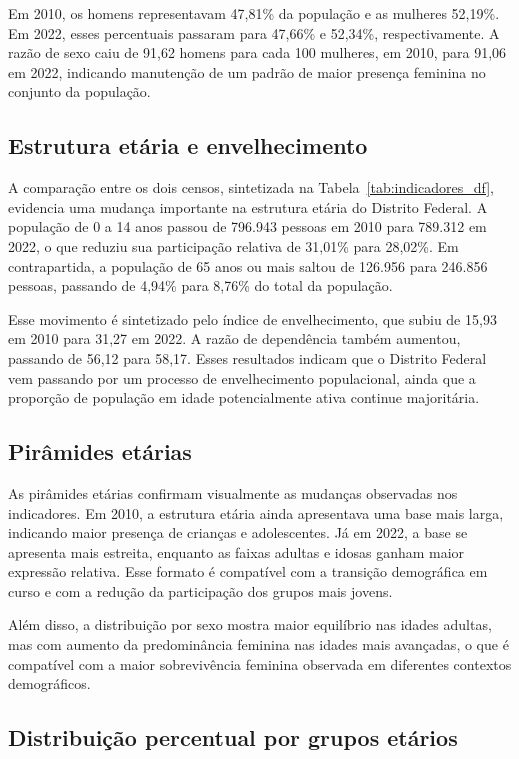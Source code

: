 \documentclass[a4paper,12pt]{article}
\begin{document}
Em 2010, os homens representavam 47,81\% da população e as mulheres 52,19\%.
Em 2022, esses percentuais passaram para 47,66\% e 52,34\%, respectivamente.
A razão de sexo caiu de 91,62 homens para cada 100 mulheres, em 2010, para
91,06 em 2022, indicando manutenção de um padrão de maior presença feminina no
conjunto da população.

\subsection{Estrutura etária e envelhecimento}

A comparação entre os dois censos, sintetizada na Tabela~\ref{tab:indicadores_df},
evidencia uma mudança importante na estrutura etária do Distrito Federal. A
população de 0 a 14 anos passou de 796.943 pessoas em 2010 para 789.312 em
2022, o que reduziu sua participação relativa de 31,01\% para 28,02\%. Em
contrapartida, a população de 65 anos ou mais saltou de 126.956 para 246.856
pessoas, passando de 4,94\% para 8,76\% do total da população.

Esse movimento é sintetizado pelo índice de envelhecimento, que subiu de 15,93
em 2010 para 31,27 em 2022. A razão de dependência também aumentou, passando de
56,12 para 58,17. Esses resultados indicam que o Distrito Federal vem passando
por um processo de envelhecimento populacional, ainda que a proporção de
população em idade potencialmente ativa continue majoritária.

\subsection{Pirâmides etárias}

As pirâmides etárias confirmam visualmente as mudanças observadas nos
indicadores. Em 2010, a estrutura etária ainda apresentava uma base mais larga,
indicando maior presença de crianças e adolescentes. Já em 2022, a base se
apresenta mais estreita, enquanto as faixas adultas e idosas ganham maior
expressão relativa. Esse formato é compatível com a transição demográfica em
curso e com a redução da participação dos grupos mais jovens.

Além disso, a distribuição por sexo mostra maior equilíbrio nas idades adultas,
mas com aumento da predominância feminina nas idades mais avançadas, o que é
compatível com a maior sobrevivência feminina observada em diferentes contextos
demográficos.



\subsection{Distribuição percentual por grupos etários}
\end{document}
